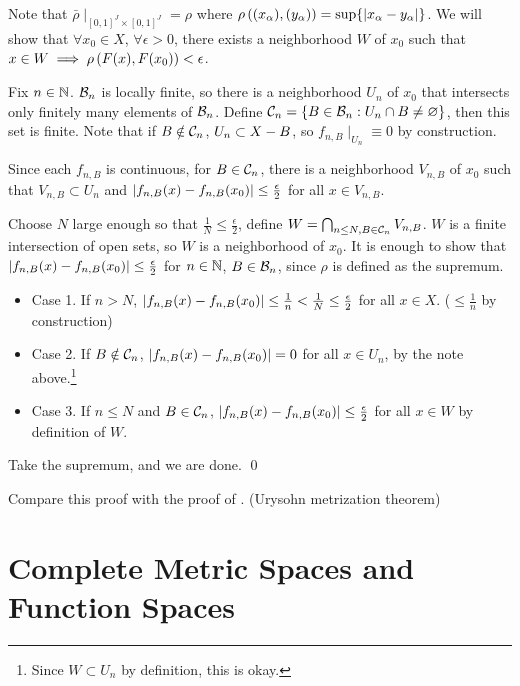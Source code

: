 Note that \(\bar{\rho}\mid_{[0, 1]^J \times [0, 1]^J} = \rho\) where \(\rho\left( (x_\alpha), (y_\alpha) \right) = \sup \{\left| x_\alpha - y_\alpha \right|\}\). We will show that \(\forall x_0 \in X\), \(\forall \epsilon > 0\), there exists a neighborhood \(W\) of \(x_0\) such that \(x \in W \implies \rho\left( F(x), F(x_0) \right) < \epsilon\).

Fix \(n \in \mathbb{N}\). \(\mathcal{B}_n\) is locally finite, so there is a neighborhood \(U_n\) of \(x_0\) that intersects only finitely many elements of \(\mathcal{B}_n\). Define \(\mathcal{C}_n = \{B \in \mathcal{B}_n : U_n \cap B \neq \varnothing\}\), then this set is finite. Note that if \(B \notin \mathcal{C}_n\), \(U_n \subset X - B\), so \(f_{n, B} \mid_{U_n} \equiv 0\) by construction.

Since each \(f_{n, B}\) is continuous, for \(B \in \mathcal{C}_n\), there is a neighborhood \(V_{n, B}\) of \(x_0\) such that \(V_{n, B} \subset U_n\) and \(\left| f_{n, B} (x) - f_{n, B} (x_0) \right| \leq \frac{\epsilon}{2}\) for all \(x \in V_{n, B}\).

Choose \(N\) large enough so that \(\frac{1}{N} \leq \frac{\epsilon}{2}\), define \(W = \bigcap_{n \leq N, B \in \mathcal{C}_n} V_{n, B}\). \(W\) is a finite intersection of open sets, so \(W\) is a neighborhood of \(x_0\). It is enough to show that \(\left| f_{n, B}(x) - f_{n, B}(x_0) \right| \leq \frac{\epsilon}{2}\) for \(n \in \mathbb{N}\), \(B \in \mathcal{B}_n\), since \(\rho\) is defined as the supremum.
\begin{itemize}
    \item Case 1. If \(n > N\), \(\left| f_{n, B}(x) - f_{n, B}(x_0) \right| \leq \frac{1}{n} < \frac{1}{N} \leq \frac{\epsilon}{2}\) for all \(x \in X\). (\(\leq \frac{1}{n}\) by construction)
    \item Case 2. If \(B \notin \mathcal{C}_n\), \(\left| f_{n, B}(x) - f_{n, B}(x_0) \right| = 0\) for all \(x \in U_n\), by the note above.\footnote{Since \(W \subset U_n\) by definition, this is okay.}
    \item Case 3. If \(n \leq N\) and \(B \in \mathcal{C}_n\), \(\left| f_{n, B}(x) - f_{n, B}(x_0) \right| \leq \frac{\epsilon}{2}\) for all \(x \in W\) by definition of \(W\).
\end{itemize}
Take the supremum, and we are done. \qed

Compare this proof with the proof of . (Urysohn metrization theorem)

\pagebreak

\chapter{Complete Metric Spaces and Function Spaces}

